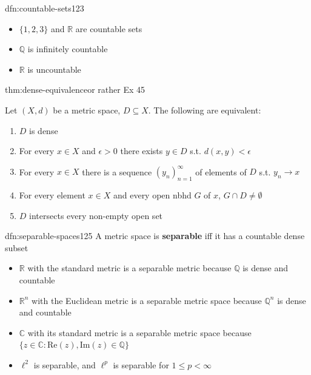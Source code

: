 \documentclass[landscape, 8pt]{extarticle}
\begin{document}
\begin{multicols}{3}
\begin{dfn}{dfn:countable-sets}{123}
    \vspace{-5pt}

    \vspace{-8pt}
    \begin{itemize}
        \item $\{1, 2, 3\}$ and $\mathbb{R}$ are countable sets
        \item $\mathbb{Q}$ is infinitely countable
        \item $\mathbb{R}$ is uncountable
    \end{itemize}
\end{dfn}

\begin{thm}{thm:dense-equivalence}{or rather Ex 45}

    \vspace{-5pt}
    Let $(X, d)$ be a metric space, $D \subseteq X$. The following are equivalent:
    \vspace{-5pt}
    \begin{enumerate}[leftmargin=*]
        \item $D$ is dense
        \item For every $x\in X$ and $\epsilon > 0$ there exists $y\in D$ s.t. $d(x, y) < \epsilon$
        \item For every $x\in X$ there is a sequence $(y_{n})^{\infty}_{n = 1}$ of elements of $D$ s.t. $y_{n}\to x$
        \item For every element $x\in X$ and every open nbhd $G$ of $x$, $G \cap D \ne \emptyset$
        \item $D$ intersects every non-empty open set
    \end{enumerate}
\end{thm}

\begin{dfn}{dfn:separable-spaces}{125}
    \vspace{-5pt}
    A metric space is \textbf{separable} iff it has a countable dense subset

    \vspace{-5pt}
    \begin{itemize}[leftmargin=*]
        \item $\mathbb{R}$ with the standard metric is a separable metric because $\mathbb{Q}$ is dense and countable
        \item $\mathbb{R}^{n}$ with the Euclidean metric is a separable metric space because $\mathbb{Q}^{n}$ is dense and countable
        \item $\mathbb{C}$ with its standard metric is a separable metric space because $\{ z\in\mathbb{C} : \text{Re}(z), \text{Im}(z)\in \mathbb{Q}\}$
        \item $\ell^{2}$ is separable, and $\ell^{p}$ is separable for $1 \le p < \infty$
    \end{itemize}
\end{dfn}


\end{multicols}
\end{document}
